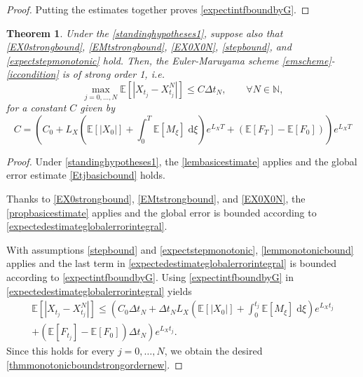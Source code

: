 \documentclass[reqno,12pt]{amsart}
\theoremstyle{plain}%
\newtheorem{thm}{Theorem}[section]
\theoremstyle{definition}
\begin{document}
\begin{proof}
    Putting the estimates together proves \eqref{expectintfboundbyG}.
\end{proof}

\begin{thm}
    \label{thmmonotonicbound}
    Under the \cref{standinghypotheses1}, suppose also that
    \eqref{EX0strongbound}, \eqref{EMtstrongbound}, \eqref{EX0X0N}, \eqref{stepbound}, and \eqref{expectstepmonotonic} hold. Then, the Euler-Maruyama scheme \eqref{emscheme}-\eqref{iccondition} is of strong order 1, i.e.
    \begin{equation}
      \label{thmmonotonicboundstrongordernew}
        \max_{j=0, \ldots, N}\mathbb{E}\left[ \left| X_{t_j} - X_{t_j}^N \right| \right] \leq C \Delta t_N, \qquad \forall N \in \mathbb{N},
    \end{equation}
    for a constant $C$ given by
    \begin{equation}
        \label{constmonotonicboundstrongordernew}
        C = \left(C_0 + L_X \left(\mathbb{E}[|X_0|] + \int_0^{T} \mathbb{E}[M_\xi]\;\mathrm{d}\xi\right)e^{L_X T} + (\mathbb{E}[F_T] - \mathbb{E}[F_0])\right)e^{L_X T}
    \end{equation}
\end{thm}

\begin{proof}
    Under \cref{standinghypotheses1}, the \cref{lembasicestimate} applies and the global error estimate \eqref{Etjbasicbound} holds.
    
    Thanks to \eqref{EX0strongbound}, \eqref{EMtstrongbound}, and \eqref{EX0X0N}, the \cref{propbasicestimate} applies and the global error is bounded according to \eqref{expectedestimateglobalerrorintegral}.
    
    With assumptions \eqref{stepbound} and \eqref{expectstepmonotonic}, \cref{lemmonotonicbound} applies and the last term in \eqref{expectedestimateglobalerrorintegral} is bounded according to \eqref{expectintfboundbyG}. Using \eqref{expectintfboundbyG} in \eqref{expectedestimateglobalerrorintegral} yields
    \begin{multline*}
        \mathbb{E} \left[|X_{t_j} - X_{t_j}^N|\right] \leq \left( C_0 \Delta t_N + \Delta t_N L_X \left(\mathbb{E}[|X_0|] + \int_0^{t_j} \mathbb{E}[M_\xi]\;\mathrm{d}\xi\right)e^{L_X t_j}\right. \\
        \left. + (\mathbb{E}[F_{t_j}] - \mathbb{E}[F_0])\Delta t_N\right) e^{L_X t_j}.
    \end{multline*}
    Since this holds for every $j=0, \ldots, N$, we obtain the desired \eqref{thmmonotonicboundstrongordernew}.
\end{proof}
\end{document}

